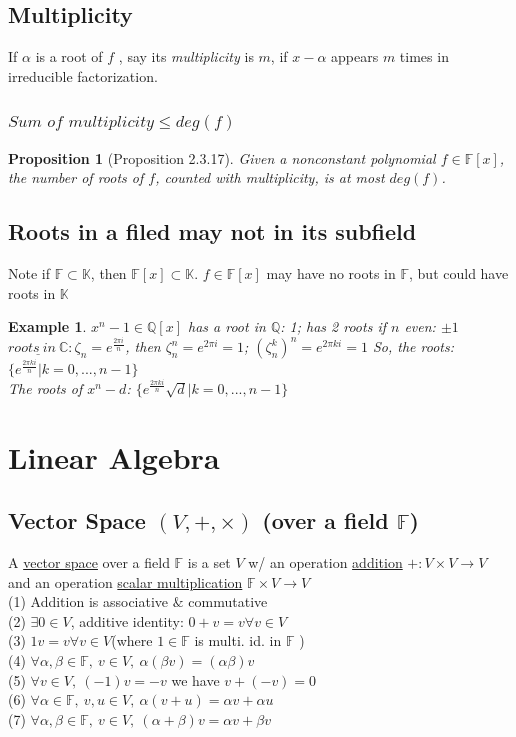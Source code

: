 \documentclass[11pt,a4paper]{article}
\newtheorem{proposition}{Proposition}
\newtheorem{example}{Example}
\begin{document}
\subsection{Multiplicity}
If $\alpha$ is a root of $f$ , say its \textit{multiplicity} is $m$, if $x-\alpha$ appears $m$ times in irreducible factorization.
\subsubsection{$\textit{Sum of multiplicity}\leq deg(f)$}
\begin{proposition}[Proposition 2.3.17]
Given a nonconstant polynomial $f\in\mathbb{F}[x]$, the number of roots of $f$, counted with multiplicity, is at most $deg(f)$.
\end{proposition}

\subsection{Roots in a filed may not in its subfield}
Note if $\mathbb{F}\subset \mathbb{K}$, then $\mathbb{F}[x]\subset\mathbb{K}$. $f\in\mathbb{F}[x]$ may have no roots in $\mathbb{F}$, but could have roots in $\mathbb{K}$
\begin{example}
    $x^n-1\in\mathbb{Q}[x]$ has a root in $\mathbb{Q}$: 1; has 2 roots if $n$ even: $\pm 1$\\
    $\underline{roots\ in\ \mathbb{C}}:\zeta_n=e^{\frac{2\pi i}{n}}$, then $\zeta_n^n=e^{2\pi i}=1$; $(\zeta_n^k)^n=e^{2\pi ki}=1$ So, the roots: $\{e^{\frac{2\pi ki}{n}}|k=0,...,n-1\}$\\
    The roots of $x^n-d$: $\{e^{\frac{2\pi ki}{n}}\sqrt{d}|k=0,...,n-1\}$\\
\end{example}



\section{Linear Algebra}
\subsection{ Vector Space $(V,+,\times)$ (over a field $\mathbb{F}$)}
A \underline{vector space} over a field $\mathbb{F}$ is a
set $V$ w/ an operation \underline{addition} $+ : V \times V \rightarrow V$ and
an operation \underline{scalar multiplication} $\mathbb{F} \times V \rightarrow V$\\
(1) Addition is associative $\&$ commutative\\
(2) $\exists 0\in V$, additive identity: $0 + v = v \forall v \in V$\\
(3) $1v = v \forall v \in V$(where $1 \in \mathbb{F}$ is multi. id. in $\mathbb{F}$ )\\
(4) $\forall \alpha,\beta\in\mathbb{F},\ v\in V,\ \alpha(\beta v)=(\alpha\beta)v$\\
(5) $\forall v\in V,\ (-1)v=-v$ we have $v+(-v)=0$\\
(6) $\forall \alpha\in\mathbb{F},\ v,u\in V,\ \alpha(v+u)=\alpha v+\alpha u$\\
(7) $\forall \alpha,\beta\in\mathbb{F},\ v\in V,\ (\alpha+\beta)v=\alpha v+\beta v$
\end{document}
